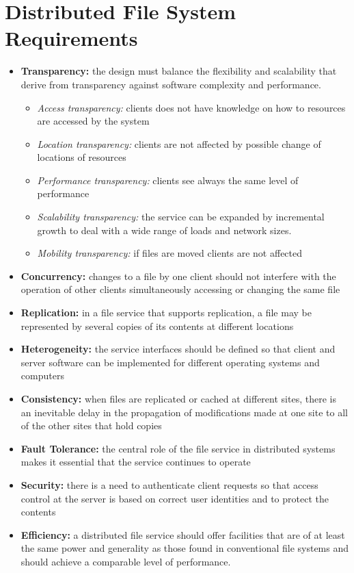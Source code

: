 \section{Distributed File System Requirements}
\begin{itemize}
    \item \textbf{Transparency:} the design must balance the flexibility and scalability that derive from transparency against software complexity and performance.
    \begin{itemize}
        \item \textit{Access transparency:} clients does not have knowledge on how to resources are accessed by the system
        \item \textit{Location transparency:} clients are not affected by possible change of locations of resources
        \item \textit{Performance transparency:} clients see always the same level of performance
        \item \textit{Scalability transparency:} the service can be expanded by incremental growth to deal with a wide range of loads and network sizes.
        \item \textit{Mobility transparency:} if files are moved clients are not affected
    \end{itemize}
    \item \textbf{Concurrency:} changes to a file by one client should not interfere with the operation of other clients simultaneously accessing or changing the same file
    \item \textbf{Replication:} in a file service that supports replication, a file may be represented by several copies of its contents at different locations
    \item \textbf{Heterogeneity:} the service interfaces should be defined so that client and server software can be implemented for different operating systems and computers
    \item \textbf{Consistency:} when files are replicated or cached at different sites, there is an inevitable delay in the propagation of modifications made at one site to all of the other sites that hold copies
    \item \textbf{Fault Tolerance:} the central role of the file service in distributed systems makes it essential that the service continues to operate
    \item \textbf{Security:} there is a need to authenticate client requests so that access control at the server is based on correct user identities and to protect the contents
    \item \textbf{Efficiency:} a distributed file service should offer facilities that are of at least the same power and generality as those found in conventional file systems and should achieve a comparable level of performance.
\end{itemize}


